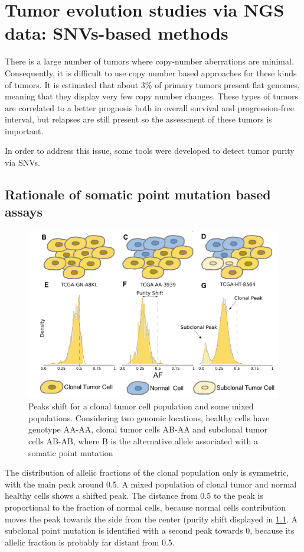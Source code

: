 \graphicspath{{chapters/TumorEvolution3Images/}}


\chapter{Tumor evolution studies via NGS data: SNVs-based methods}

There is a large number of tumors where copy-number aberrations are minimal. Consequently, it is difficult to use copy number based approaches for these kinds of tumors. It is estimated that about 3\% of primary tumors present flat genomes, meaning that they display very few copy number changes. These types of tumors are correlated to a better prognosis both in overall survival and progression-free interval, but relapses are still present so the assessment of these tumors is important.

In order to address this issue, some tools were developed to detect tumor purity via SNVs.

\section{Rationale of somatic point mutation based assays}

\begin{figure}[!ht]
\centering
    \includegraphics[width=0.5\linewidth]{peaks.png}
    \caption{\label{fig:peaks}Peaks shift for a clonal tumor cell population and some mixed populations. Considering two genomic locations, healthy cells have genotype AA-AA, clonal tumor cells AB-AA and subclonal tumor cells AB-AB, where B is the alternative allele associated with a somatic point mutation}
\end{figure}

The distribution of allelic fractions of the clonal population only is symmetric, with the main peak around 0.5. A mixed population of clonal tumor and normal healthy cells shows a shifted peak. The distance from 0.5 to the peak is proportional to the fraction of normal cells, because normal cells contribution moves the peak towards the side from the center (purity shift displayed in \ref{fig:peaks}. A subclonal point mutation is identified with a second peak towards 0, because its allelic fraction is probably far distant from 0.5.

